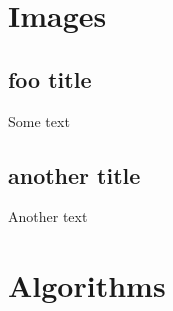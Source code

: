 \documentclass[
11pt,
twoside
]{report}
\begin{document}
\printbibliography





\appendix
\renewcommand{\thesection}{\Alph{section}.\arabic{section}}
\setcounter{section}{0}
\begin{appendices}


\section{Images}
\listoffigures

\subsection{foo title}
Some text
\subsection{another title}
Another text



\section{Algorithms}
\listofalgorithms



\end{appendices}
\end{document}
